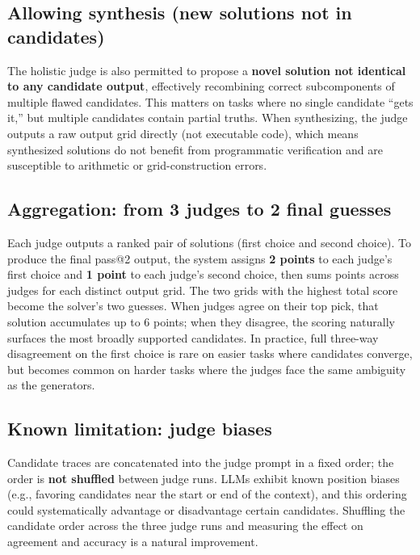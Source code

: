 \documentclass[11pt]{article}
\begin{document}
\hypertarget{allowing-synthesis-new-solutions-not-in-candidates}{%
\subsection{Allowing synthesis (new solutions not in
candidates)}\label{allowing-synthesis-new-solutions-not-in-candidates}}

The holistic judge is also permitted to propose a \textbf{novel solution
not identical to any candidate output}, effectively recombining correct
subcomponents of multiple flawed candidates. This matters on tasks where
no single candidate ``gets it,'' but multiple candidates contain partial
truths. When synthesizing, the judge outputs a raw output grid directly
(not executable code), which means synthesized solutions do not benefit
from programmatic verification and are susceptible to arithmetic or
grid-construction errors.

\hypertarget{aggregation-from-3-judges-to-2-final-guesses}{%
\subsection{Aggregation: from 3 judges to 2 final
guesses}\label{aggregation-from-3-judges-to-2-final-guesses}}

Each judge outputs a ranked pair of solutions (first choice and second
choice). To produce the final pass@2 output, the system assigns
\textbf{2 points} to each judge's first choice and \textbf{1 point} to
each judge's second choice, then sums points across judges for each
distinct output grid. The two grids with the highest total score become
the solver's two guesses. When judges agree on their top pick, that
solution accumulates up to 6 points; when they disagree, the scoring
naturally surfaces the most broadly supported candidates. In practice,
full three-way disagreement on the first choice is rare on easier tasks
where candidates converge, but becomes common on harder tasks where the
judges face the same ambiguity as the generators.

\hypertarget{known-limitation-judge-biases}{%
\subsection{Known limitation: judge
biases}\label{known-limitation-judge-biases}}

Candidate traces are concatenated into the judge prompt in a fixed
order; the order is \textbf{not shuffled} between judge runs. LLMs
exhibit known position biases (e.g., favoring candidates near the start
or end of the context), and this ordering could systematically advantage
or disadvantage certain candidates. Shuffling the candidate order across
the three judge runs and measuring the effect on agreement and accuracy
is a natural improvement.
\end{document}
